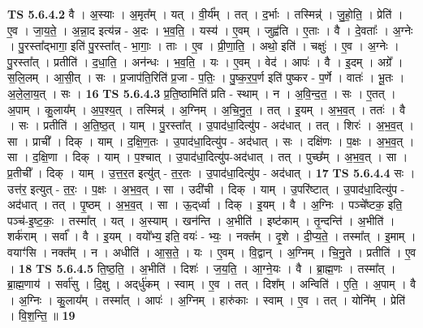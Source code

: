 \documentclass[17pt]{extarticle}
\begin{document}
                  \newline
                                \textbf{ TS 5.6.4.2} \newline
                  वै । अ॒स्याः । अ॒मृत᳚म् । यत् । वी॒र्य᳚म् । तत् । द॒र्भाः । तस्मिन्न्॑ । जु॒हो॒ति॒ । प्रेति॑ । ए॒व । जा॒य॒ते॒ । अ॒न्ना॒द इत्य॑न्न - अ॒दः । भ॒व॒ति॒ । यस्य॑ । ए॒वम् । जुह्व॑ति । ए॒ताः । वै । दे॒वताः᳚ । अ॒ग्नेः । पु॒रस्ता᳚द्भागा॒ इति॑ पु॒रस्ता᳚त् - भा॒गाः॒ । ताः । ए॒व । प्री॒णा॒ति॒ । अथो॒ इति॑ । चक्षुः॑ । ए॒व । अ॒ग्नेः । पु॒रस्ता᳚त् । प्रतीति॑ । द॒धा॒ति॒ । अन॑न्धः । भ॒व॒ति॒ । यः । ए॒वम् । वेद॑ । आपः॑ । वै । इ॒दम् । अग्रे᳚ । स॒लि॒लम् । आ॒सी॒त् । सः । प्र॒जाप॑ति॒रिति॑ प्र॒जा - प॒तिः॒ । पु॒ष्क॒र॒प॒र्ण इति॑ पुष्कर - प॒र्णे । वातः॑ । भू॒तः । अ॒ले॒ला॒य॒त् । सः । \textbf{  16} \newline
                  \newline
                                \textbf{ TS 5.6.4.3} \newline
                  प्र॒ति॒ष्ठामिति॑ प्रति - स्थाम् । न । अ॒वि॒न्द॒त॒ । सः । ए॒तत् । अ॒पाम् । कु॒लाय᳚म् । अ॒प॒श्य॒त् । तस्मिन्न्॑ । अ॒ग्निम् । अ॒चि॒नु॒त॒ । तत् । इ॒यम् । अ॒भ॒व॒त् । ततः॑ । वै । सः । प्रतीति॑ । अ॒ति॒ष्ठ॒त् । याम् । पु॒रस्ता᳚त् । उ॒पाद॑धा॒दित्यु॑प - अद॑धात् । तत् । शिरः॑ । अ॒भ॒व॒त् । सा । प्राची᳚ । दिक् । याम् । द॒क्षि॒ण॒तः । उ॒पाद॑धा॒दित्यु॑प - अद॑धात् । सः । दक्षि॑णः । प॒क्षः । अ॒भ॒व॒त् । सा । द॒क्षि॒णा । दिक् । याम् । प॒श्चात् । उ॒पाद॑धा॒दित्यु॑प-अद॑धात् । तत् । पुच्छ᳚म् । अ॒भ॒व॒त् । सा । प्र॒तीची᳚ । दिक् । याम् । उ॒त्त॒र॒त इत्यु॑त् - त॒र॒तः । उ॒पाद॑धा॒दित्यु॑प - अद॑धात् । \textbf{  17 } \newline
                  \newline
                                \textbf{ TS 5.6.4.4} \newline
                  सः । उत्त॑र॒ इत्युत् - त॒रः॒ । प॒क्षः । अ॒भ॒व॒त् । सा । उदी॑ची । दिक् । याम् । उ॒परि॑ष्टात् । उ॒पाद॑धा॒दित्यु॑प - अद॑धात् । तत् । पृ॒ष्ठम् । अ॒भ॒व॒त् । सा । ऊ॒द्‌र्ध्वा । दिक् । इ॒यम् । वै । अ॒ग्निः । पञ्चे᳚ष्टक॒ इति॒ पञ्च॑-इ॒ष्ट॒कः॒ । तस्मा᳚त् । यत् । अ॒स्याम् । खन॑न्ति । अ॒भीति॑ । इष्ट॑काम् । तृ॒न्दन्ति॑ । अ॒भीति॑ । शर्क॑राम् । सर्वा᳚ । वै । इ॒यम् । वयो᳚भ्य॒ इति॒ वयः॑ - भ्यः॒ । नक्त᳚म् । दृ॒शे । दी॒प्य॒ते॒ । तस्मा᳚त् । इ॒माम् । वयाꣳ॑सि । नक्त᳚म् । न । अधीति॑ । आ॒स॒ते॒ । यः । ए॒वम् । वि॒द्वान् । अ॒ग्निम् । चि॒नु॒ते । प्रतीति॑ । ए॒व । \textbf{  18} \newline
                  \newline
                                \textbf{ TS 5.6.4.5} \newline
                  ति॒ष्ठ॒ति॒ । अ॒भीति॑ । दिशः॑ । ज॒य॒ति॒ । आ॒ग्ने॒यः । वै । ब्रा॒ह्म॒णः । तस्मा᳚त् । ब्रा॒ह्म॒णाय॑ । सर्वा॑सु । दि॒क्षु । अद्‌र्धु॑कम् । स्वाम् । ए॒व । तत् । दिश᳚म् । अन्विति॑ । ए॒ति॒ । अ॒पाम् । वै । अ॒ग्निः । कु॒लाय᳚म् । तस्मा᳚त् । आपः॑ । अ॒ग्निम् । हारु॑काः । स्वाम् । ए॒व । तत् । योनि᳚म् । प्रेति॑ । वि॒श॒न्ति॒ ॥ \textbf{  19} \newline
\end{document}
